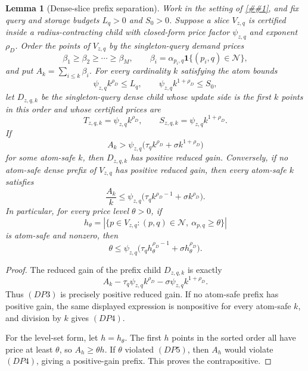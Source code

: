 \documentclass[10pt]{article}
\newcommand{\cref}[1]{\ref{##1}}
\newtheorem{lemma}[theorem]{Lemma}
\theoremstyle{definition}
\begin{document}
\begin{lemma}[Dense-slice prefix separation]
   \label{lem:dense-slice-prefix-separation}
   Work in the setting of \cref{lem:high-correlation-dense-slice-separator}, and
   fix query and storage budgets \(L_q>0\) and \(S_0>0\).  Suppose a slice
   \(V_{z,q}\) is certified inside a radius-contracting child with closed-form
   price factor \(\psi_{z,q}\) and exponent \(\rho_D\).  Order the points of
   \(V_{z,q}\) by the singleton-query demand prices
   \[
      \beta_1\ge\beta_2\ge\cdots\ge\beta_M,
      \qquad
      \beta_i=\alpha_{p_i,q}\mathbf 1\{(p_i,q)\in\mathcal N\},
   \]
   and put \(A_k=\sum_{i\le k}\beta_i\).  For every cardinality \(k\) satisfying
   the atom bounds
   \[
      \psi_{z,q}k^{\rho_D}\le L_q,
      \qquad
      \psi_{z,q}k^{1+\rho_D}\le S_0,
      \tag{DP1}
   \]
   let \(D_{z,q,k}\) be the singleton-query dense child whose update side is the
   first \(k\) points in this order and whose certified prices are
   \[
      T_{z,q,k}=\psi_{z,q}k^{\rho_D},
      \qquad
      S_{z,q,k}=\psi_{z,q}k^{1+\rho_D}.
      \tag{DP2}
   \]
   If
   \[
      A_k>\psi_{z,q}\bigl(\tau_qk^{\rho_D}+\sigma k^{1+\rho_D}\bigr)
      \tag{DP3}
   \]
   for some atom-safe \(k\), then \(D_{z,q,k}\) has positive reduced gain.
   Conversely, if no atom-safe dense prefix of \(V_{z,q}\) has positive reduced
   gain, then every atom-safe \(k\) satisfies
   \[
      \frac{A_k}{k}
      \le
      \psi_{z,q}\bigl(\tau_qk^{\rho_D-1}+\sigma k^{\rho_D}\bigr).
      \tag{DP4}
   \]
   In particular, for every price level \(\theta>0\), if
   \[
      h_\theta=
      \left|\{p\in V_{z,q}:(p,q)\in\mathcal N,\ \alpha_{p,q}\ge\theta\}\right|
   \]
   is atom-safe and nonzero, then
   \[
      \theta
      \le
      \psi_{z,q}\bigl(\tau_qh_\theta^{\rho_D-1}
      +\sigma h_\theta^{\rho_D}\bigr).
      \tag{DP5}
   \]
\end{lemma}

\begin{proof}
   The reduced gain of the prefix child \(D_{z,q,k}\) is exactly
   \[
      A_k-\tau_q\psi_{z,q}k^{\rho_D}
      -\sigma\psi_{z,q}k^{1+\rho_D}.
   \]
   Thus \((DP3)\) is precisely positive reduced gain.  If no atom-safe prefix has
   positive gain, the same displayed expression is nonpositive for every
   atom-safe \(k\), and division by \(k\) gives \((DP4)\).

   For the level-set form, let \(h=h_\theta\).  The first \(h\) points in the
   sorted order all have price at least \(\theta\), so \(A_h\ge\theta h\).  If
   \(\theta\) violated \((DP5)\), then \(A_h\) would violate \((DP4)\), giving a
   positive-gain prefix.  This proves the contrapositive.
\end{proof}
\end{document}

